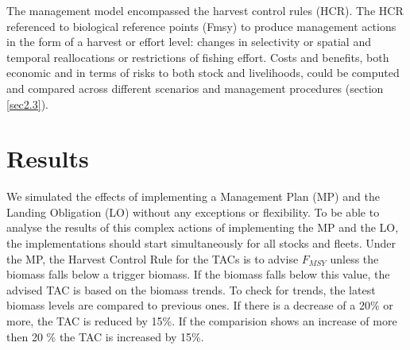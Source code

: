 \documentclass[12pt,oneline,a4paper,numbib]{ouparticle}
\numberwithin{equation}{subsection} %
\begin{document}
        




The management model encompassed the harvest control rules (HCR). The HCR referenced to biological reference points (Fmsy) to produce management actions in the form of a harvest or effort level: changes in selectivity or spatial and temporal reallocations or restrictions of fishing effort. Costs and benefits, both economic and in terms of risks to both stock and livelihoods, could be computed and compared across different scenarios and management procedures (section \ref{sec2.3}).




\section{Results}
\label{sec3}

We simulated the effects of implementing a Management Plan (MP) and the Landing Obligation (LO) without any exceptions or flexibility. To be able to analyse the results of this complex actions of implementing the MP and the LO, the implementations should start simultaneously for all stocks and fleets. Under the MP, the Harvest Control Rule for the TACs is to advise $F_{MSY}$ unless the biomass falls below a trigger biomass. If the biomass falls below this value, the advised TAC is based on the biomass trends. To check for trends, the latest biomass levels are compared to previous ones. If there is a decrease of a 20\% or more, the TAC is reduced by 15\%. If the comparision shows an increase of more then 20 \% the TAC is increased by 15\%.
\end{document}
